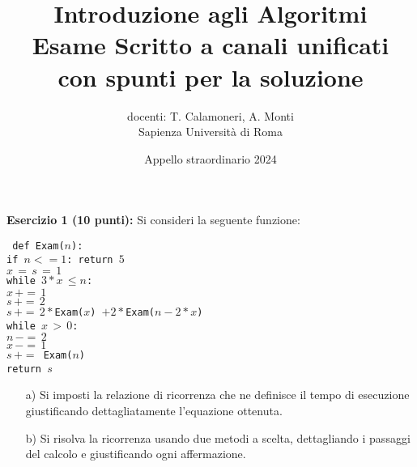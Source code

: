 \documentclass[12pt]{article}
\title{{Introduzione agli Algoritmi}\\ {\bf Esame Scritto a canali unificati} \\ {\bf con spunti per la soluzione}
\vspace*{-.5cm}}
\author{ 
docenti: {T. Calamoneri, A. Monti}\\ 
Sapienza Universit\`a di Roma\\ 
\vspace*{-1cm}
\date{Appello straordinario 2024}
}
\begin{document}
\maketitle


\vspace*{-.5cm}
\noindent
\textbf{Esercizio 1 (10 punti): } 
Si consideri la seguente funzione: 
\medskip

{\tt
\noindent def Exam($n$):\\
\hspace*{0.5cm} if $n <= 1$: return $5$\\
\hspace*{0.5cm} $x\,=\,s\,=\,1$ \\
\hspace*{0.5cm} while $3*x\, \leq n$: \\
\hspace*{1.5cm} $x\,+=\,1$\\
\hspace*{1.5cm} $s\,+=\,2$\\
\hspace*{0.5cm} $s\,+=\,2*$Exam($x$) $+2*$Exam($n-2*x$)\\ 
\hspace*{0.5cm} while  $x\,>\,0$: \\
\hspace*{1.5cm} $n\,-=\,2$ \\
\hspace*{1.5cm} $x\,-=\,1$\\
\hspace*{0.5cm} $s\,+=$ Exam($ n$)\\
\hspace*{0.5cm} return $s$
}
\\


\begin{itemize}
\item[a)] Si imposti la relazione di ricorrenza che ne definisce il tempo di esecuzione giustificando dettagliatamente l'equazione ottenuta.
\item[b)] Si risolva la ricorrenza  usando due metodi a scelta, dettagliando i passaggi del calcolo e giustificando ogni affermazione. 
\end{itemize}
\end{document}
